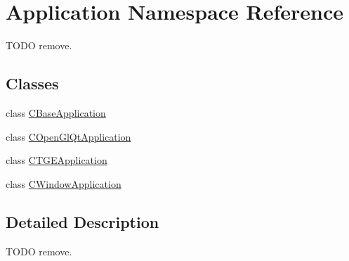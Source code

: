 \hypertarget{namespace_application}{}\section{Application Namespace Reference}
\label{namespace_application}


T\+O\+DO remove.  


\subsection*{Classes}
\begin{DoxyCompactItemize}
\item 
class \mbox{\hyperlink{class_application_1_1_c_base_application}{C\+Base\+Application}}
\item 
class \mbox{\hyperlink{class_application_1_1_c_open_gl_qt_application}{C\+Open\+Gl\+Qt\+Application}}
\item 
class \mbox{\hyperlink{class_application_1_1_c_t_g_e_application}{C\+T\+G\+E\+Application}}
\item 
class \mbox{\hyperlink{class_application_1_1_c_window_application}{C\+Window\+Application}}
\end{DoxyCompactItemize}


\subsection{Detailed Description}
T\+O\+DO remove. 